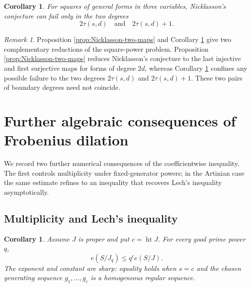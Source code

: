 \documentclass[11pt]{amsart}
\newtheorem{corollary}[theorem]{Corollary}
\theoremstyle{remark}
\newtheorem{remark}[theorem]{Remark}
\begin{document}
\begin{corollary}\label{cor:Nicklasson-squares}
For squares of general forms in three variables, Nicklasson's conjecture can fail only in the two degrees
$$
2\tau(s,d)
\quad\text{and}\quad
2\tau(s,d)+1.
$$
\end{corollary}

\begin{remark}
Proposition \ref{prop:Nicklasson-two-maps} and Corollary \ref{cor:Nicklasson-squares} give two complementary reductions of the square-power problem. Proposition \ref{prop:Nicklasson-two-maps} reduces Nicklasson's conjecture to the last injective and first surjective maps for forms of degree $2d$, whereas Corollary \ref{cor:Nicklasson-squares} confines any possible failure to the two degrees $2\tau(s,d)$ and $2\tau(s,d)+1$. These two pairs of boundary degrees need not coincide.
\end{remark}


\section{Further algebraic consequences of Frobenius dilation}\label{sec:further}

We record two further numerical consequences of the coefficientwise inequality. The first controls multiplicity under fixed-generator powers; in the Artinian case the same estimate refines to an inequality that recovers Lech's inequality asymptotically.

\subsection{Multiplicity and Lech's inequality}

\begin{corollary}\label{cor:multiplicity}
Assume $J$ is proper and put $c=\operatorname{ht}J$. For every good prime power $q$,
\begin{equation}\label{eq:multiplicity}
e(S/J_q)\le q^c e(S/J).
\end{equation}
The exponent and constant are sharp: equality holds when $s=c$ and the chosen generating sequence $g_1,\ldots,g_c$ is a homogeneous regular sequence.
\end{corollary}
\end{document}
